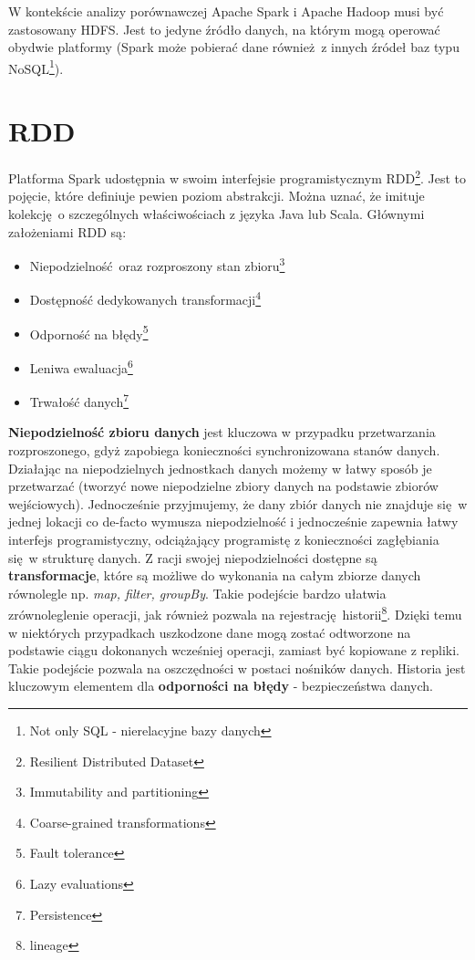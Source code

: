 \newline W kontekście analizy porównawczej Apache Spark i Apache Hadoop musi być zastosowany HDFS. Jest to jedyne źródło danych, na którym mogą operować obydwie platformy (Spark może pobierać dane również z innych źródeł baz typu NoSQL\footnote{Not only SQL - nierelacyjne bazy danych}).

\section{RDD}\label{rdd-section}
Platforma Spark udostępnia w swoim interfejsie programistycznym RDD\footnote{Resilient Distributed Dataset}. Jest to pojęcie, które definiuje pewien poziom abstrakcji. Można uznać, że imituje kolekcję o szczególnych właściwościach z języka Java lub Scala. Głównymi założeniami RDD są\cite{Zaharia:2012:RDD:2228298.2228301}:
\begin{itemize}
	\item Niepodzielność oraz rozproszony stan zbioru\footnote{Immutability and partitioning}
	\item Dostępność dedykowanych transformacji\footnote{Coarse-grained transformations}
	\item Odporność na błędy\footnote{Fault tolerance}
	\item Leniwa ewaluacja\footnote{Lazy evaluations}
	\item Trwałość danych\footnote{Persistence}	
\end{itemize}
\textbf{Niepodzielność zbioru danych} jest kluczowa w przypadku przetwarzania rozproszonego, gdyż zapobiega konieczności synchronizowana stanów danych. Działając na niepodzielnych jednostkach danych możemy w łatwy sposób je przetwarzać (tworzyć nowe niepodzielne zbiory danych na podstawie zbiorów wejściowych). Jednocześnie przyjmujemy, że dany zbiór danych nie znajduje się w jednej lokacji co de-facto wymusza niepodzielność i jednocześnie zapewnia łatwy interfejs programistyczny, odciążający programistę z konieczności zagłębiania się w strukturę danych. 
\newline Z racji swojej niepodzielności dostępne są \textbf{transformacje}, które są możliwe do wykonania na całym zbiorze danych równolegle np. \textit{map, filter, groupBy}. Takie podejście bardzo ułatwia zrównoleglenie operacji, jak również pozwala na rejestrację historii\footnote{lineage}. Dzięki temu w niektórych przypadkach uszkodzone dane mogą zostać odtworzone na podstawie ciągu dokonanych wcześniej operacji, zamiast być kopiowane z repliki. Takie podejście pozwala na oszczędności w postaci nośników danych. Historia jest kluczowym elementem dla \textbf{odporności na błędy} - bezpieczeństwa danych.
